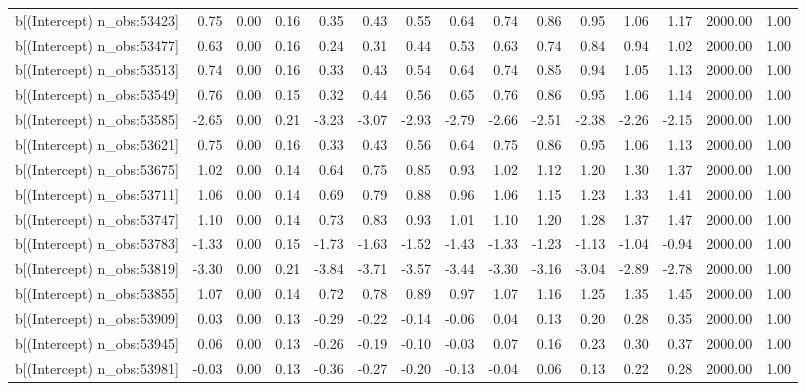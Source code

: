 \begin{table}[ht]
\begin{tabular}{rrrrrrrrrrrrrrr}
  b[(Intercept) n\_obs:53423] & 0.75 & 0.00 & 0.16 & 0.35 & 0.43 & 0.55 & 0.64 & 0.74 & 0.86 & 0.95 & 1.06 & 1.17 & 2000.00 & 1.00 \\ 
  b[(Intercept) n\_obs:53477] & 0.63 & 0.00 & 0.16 & 0.24 & 0.31 & 0.44 & 0.53 & 0.63 & 0.74 & 0.84 & 0.94 & 1.02 & 2000.00 & 1.00 \\ 
  b[(Intercept) n\_obs:53513] & 0.74 & 0.00 & 0.16 & 0.33 & 0.43 & 0.54 & 0.64 & 0.74 & 0.85 & 0.94 & 1.05 & 1.13 & 2000.00 & 1.00 \\ 
  b[(Intercept) n\_obs:53549] & 0.76 & 0.00 & 0.15 & 0.32 & 0.44 & 0.56 & 0.65 & 0.76 & 0.86 & 0.95 & 1.06 & 1.14 & 2000.00 & 1.00 \\ 
  b[(Intercept) n\_obs:53585] & -2.65 & 0.00 & 0.21 & -3.23 & -3.07 & -2.93 & -2.79 & -2.66 & -2.51 & -2.38 & -2.26 & -2.15 & 2000.00 & 1.00 \\ 
  b[(Intercept) n\_obs:53621] & 0.75 & 0.00 & 0.16 & 0.33 & 0.43 & 0.56 & 0.64 & 0.75 & 0.86 & 0.95 & 1.06 & 1.13 & 2000.00 & 1.00 \\ 
  b[(Intercept) n\_obs:53675] & 1.02 & 0.00 & 0.14 & 0.64 & 0.75 & 0.85 & 0.93 & 1.02 & 1.12 & 1.20 & 1.30 & 1.37 & 2000.00 & 1.00 \\ 
  b[(Intercept) n\_obs:53711] & 1.06 & 0.00 & 0.14 & 0.69 & 0.79 & 0.88 & 0.96 & 1.06 & 1.15 & 1.23 & 1.33 & 1.41 & 2000.00 & 1.00 \\ 
  b[(Intercept) n\_obs:53747] & 1.10 & 0.00 & 0.14 & 0.73 & 0.83 & 0.93 & 1.01 & 1.10 & 1.20 & 1.28 & 1.37 & 1.47 & 2000.00 & 1.00 \\ 
  b[(Intercept) n\_obs:53783] & -1.33 & 0.00 & 0.15 & -1.73 & -1.63 & -1.52 & -1.43 & -1.33 & -1.23 & -1.13 & -1.04 & -0.94 & 2000.00 & 1.00 \\ 
  b[(Intercept) n\_obs:53819] & -3.30 & 0.00 & 0.21 & -3.84 & -3.71 & -3.57 & -3.44 & -3.30 & -3.16 & -3.04 & -2.89 & -2.78 & 2000.00 & 1.00 \\ 
  b[(Intercept) n\_obs:53855] & 1.07 & 0.00 & 0.14 & 0.72 & 0.78 & 0.89 & 0.97 & 1.07 & 1.16 & 1.25 & 1.35 & 1.45 & 2000.00 & 1.00 \\ 
  b[(Intercept) n\_obs:53909] & 0.03 & 0.00 & 0.13 & -0.29 & -0.22 & -0.14 & -0.06 & 0.04 & 0.13 & 0.20 & 0.28 & 0.35 & 2000.00 & 1.00 \\ 
  b[(Intercept) n\_obs:53945] & 0.06 & 0.00 & 0.13 & -0.26 & -0.19 & -0.10 & -0.03 & 0.07 & 0.16 & 0.23 & 0.30 & 0.37 & 2000.00 & 1.00 \\ 
  b[(Intercept) n\_obs:53981] & -0.03 & 0.00 & 0.13 & -0.36 & -0.27 & -0.20 & -0.13 & -0.04 & 0.06 & 0.13 & 0.22 & 0.28 & 2000.00 & 1.00 \\ 

\end{tabular}
\end{table}
